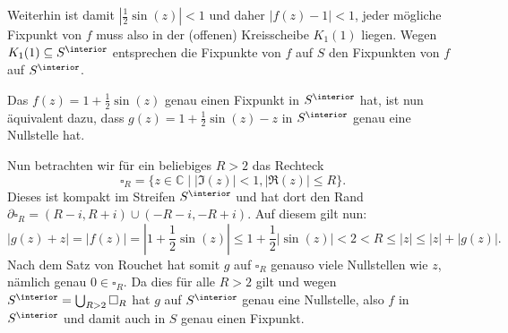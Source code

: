 \documentclass[a4paper]{article}
\begin{document}
Weiterhin ist damit $|\frac{1}{2} \sin(z)| < 1$ und daher $|f(z) - 1| < 1$, jeder mögliche Fixpunkt von $f$ muss also in der (offenen) Kreisscheibe $K_1(1)$ liegen.
Wegen $K_1(1) \subseteq S^\interior$ entsprechen die Fixpunkte von $f$ auf $S$ den Fixpunkten von $f$ auf $S^\interior$.

Das $f(z) = 1 + \frac{1}{2} \sin(z)$ genau einen Fixpunkt in $S^\interior$ hat, ist nun äquivalent dazu, dass $g(z) = 1 + \frac{1}{2} \sin(z) - z$ in $S^\interior$ genau eine Nullstelle hat.

Nun betrachten wir für ein beliebiges $R > 2$ das Rechteck 
\begin{equation*}
	\square_R = \{z \in \mathds{C} \mid |\Im(z)| < 1, |\Re(z)| \leq R\}\text{.}
\end{equation*}
Dieses ist kompakt im Streifen $S^\interior$ und hat dort den Rand $\partial \square_R = (R - i, R + i) \cup (-R - i, -R + i)$. Auf diesem gilt nun:
\begin{equation*}
	|g(z) + z| = |f(z)| = |1 + \frac{1}{2} \sin(z)| \leq 1 + \frac{1}{2} | \sin(z)| < 2 < R \leq |z| \leq |z| + |g(z)|\text{.}
\end{equation*}
Nach dem Satz von Rouchet hat somit $g$ auf $\square_R$ genauso viele Nullstellen wie $z$, nämlich genau $0 \in \square_R$.
Da dies für alle $R > 2$ gilt und wegen $S^\interior = \bigcup_{R > 2} \square_R$ hat $g$ auf $S^\interior$ genau eine Nullstelle, also $f$ in $S^\interior$ und damit auch in $S$ genau einen Fixpunkt.
\end{document}
